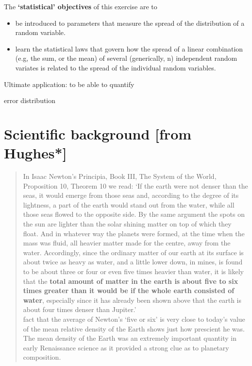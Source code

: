 \documentclass[]{book}
\begin{document}
The \textbf{`statistical' objectives} of this exercise are to

\begin{itemize}
\item
  be introduced to parameters that measure the spread of the distribution of a random variable.
\item
  learn the statistical laws that govern how the spread of a linear combination (e.g, the sum, or the mean) of several (generically, n) independent random variates is related to the spread of the individual random variables.
\end{itemize}

Ultimate application: to be able to quantify

error distribution

\hypertarget{scientific-background-from-hughes}{%
\section{Scientific background {[}from Hughes*{]}}\label{scientific-background-from-hughes}}

\begin{quote}
In Isaac Newton's Principia, Book III, The System of the World, Proposition 10, Theorem 10 we read: `If the earth were not denser than the seas, it would emerge from those seas and, according to the degree of its lightness, a part of the earth would stand out from the water, while all those seas flowed to the opposite side. By the same argument the spots on the sun are lighter than the solar shining matter on top of which they float. And in whatever way the planets were formed, at the time when the mass was fluid, all heavier matter made for the centre, away from the water. Accordingly, since the ordinary matter of our earth at its surface is about twice as heavy as water, and a little lower down, in mines, is found to be about three or four or even five times heavier than water, it is likely that the \textbf{total amount of matter in the earth is about five to six times greater than it would be if the whole earth consisted of water}, especially since it has already been shown above that the earth is about four times denser than Jupiter.'\\
\hspace*{0.333em}\hspace*{0.333em}\hspace*{0.333em}\The fact that the average of Newton's `five or six' is very close to today's value of the mean relative density of the Earth shows just how prescient he was. The mean density of the Earth was an extremely important quantity in early Renaissance science as it provided a strong clue as to planetary composition.
\end{quote}
\end{document}
